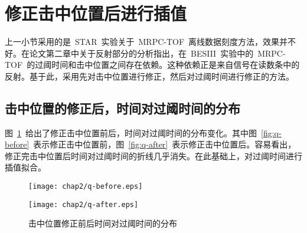\begin{comment}

\subsection{反射问题}
图~\ref{fig:TOT}~是信号的过阈时间。对于一定的阈值，幅度大小不同的信号，对应的过阈时间不同。信号幅度越大，过阈时间也就越大。
图~\ref{fig:reflection}~是~MRPC~读数条的反射问题，分为近端反射和远端反射。由于读数条本身较短，反射信号只是比真实信号时间晚不到1ns，这样导致反射信号和原来的真实信号叠加。测量的过阈时间也就变大了。
正是由于过阈问题和反射问题的存在，导致时间对过阈时间的分布复杂。对时间和过阈时间的关系的研究也刻度研究的重点和难点部分。

\begin{figure}[!h]
\begin{minipage}[!h]{0.5\linewidth}
\texttt{[image: chap2/TOT.png]}
\subcaption{过阈时间~\cite{Shao:2009aa}~}
\label{fig:TOT}
\end{minipage}
\hfill
\begin{minipage}[!h]{0.5\linewidth}
\texttt{[image: chap2/reflection.png]}
\subcaption{反射问题}
\label{fig:reflection}
\end{minipage}%
\caption{反射问题和过阈时间}
\end{figure}

\end{comment}
\section{修正击中位置后进行插值}
上一小节采用的是~STAR~实验关于~MRPC-TOF~离线数据刻度方法，效果并不好。在论文第二章中关于反射部分的分析指出，在~BESIII~实验中的~MRPC-TOF~的过阈时间和击中位置之间存在依赖。这种依赖正是来自信号在读数条中的反射。基于此，采用先对击中位置进行修正，然后对过阈时间进行修正的方法。
\subsection{击中位置的修正后，时间对过阈时间的分布}
图~\ref{fig:t2q}~给出了修正击中位置前后，时间对过阈时间的分布变化。其中图~\ref{fig:q-before}~表示修正击中位置前，图~\ref{fig:q-after}~表示修正击中位置后。容易看出，修正完击中位置后时间对过阈时间的折线几乎消失。在此基础上，对过阈时间进行插值拟合。
\begin{figure}[!h]
\begin{minipage}[!h]{0.5\linewidth}
\texttt{[image: chap2/q-before.eps]}
\label{fig:q-before}
\end{minipage}%
\hfill
\begin{minipage}[!h]{0.5\linewidth}
\texttt{[image: chap2/q-after.eps]}
\label{fig:q-after}
\end{minipage}
\caption{击中位置修正前后时间对过阈时间的分布}
\label{fig:t2q}
\end{figure}

